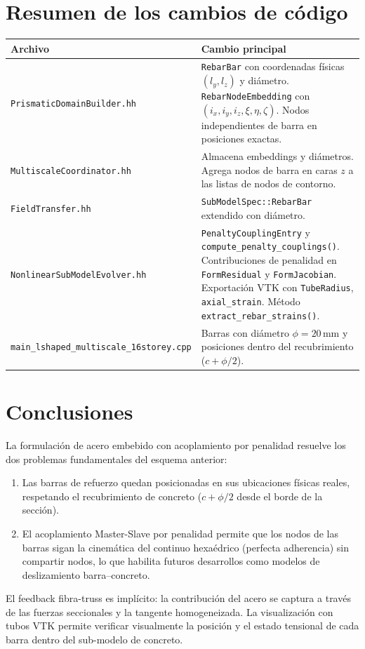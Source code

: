\section{Resumen de los cambios de código}
\label{sec:emb-code-summary}

\begin{center}
\small
\begin{tabular}{lp{8cm}}
\toprule
Archivo & Cambio principal \\
\midrule
\texttt{PrismaticDomainBuilder.hh} &
  \texttt{RebarBar} con coordenadas físicas $(l_y, l_z)$ y diámetro.
  \texttt{RebarNodeEmbedding} con $(i_x, i_y, i_z, \xi, \eta, \zeta)$.
  Nodos independientes de barra en posiciones exactas. \\[2pt]
\texttt{MultiscaleCoordinator.hh} &
  Almacena embeddings y diámetros.  Agrega nodos de barra en caras
  $z$ a las listas de nodos de contorno. \\[2pt]
\texttt{FieldTransfer.hh} &
  \texttt{SubModelSpec::RebarBar} extendido con diámetro. \\[2pt]
\texttt{NonlinearSubModelEvolver.hh} &
  \texttt{PenaltyCouplingEntry} y
  \texttt{compute\_penalty\_couplings()}.
  Contribuciones de penalidad en \texttt{FormResidual} y
  \texttt{FormJacobian}.  Exportación VTK con \texttt{TubeRadius},
  \texttt{axial\_strain}.  Método
  \texttt{extract\_rebar\_strains()}. \\[2pt]
\texttt{main\_lshaped\_multiscale\_16storey.cpp} &
  Barras con diámetro $\phi = 20$\,mm y posiciones dentro del
  recubrimiento ($c + \phi/2$). \\
\bottomrule
\end{tabular}
\end{center}


\section{Conclusiones}
\label{sec:emb-conclusions}

La formulación de acero embebido con acoplamiento por penalidad
resuelve los dos problemas fundamentales del esquema anterior:

\begin{enumerate}
  \item Las barras de refuerzo quedan posicionadas en sus ubicaciones
        físicas reales, respetando el recubrimiento de concreto
        ($c + \phi/2$ desde el borde de la sección).

  \item El acoplamiento Master-Slave por penalidad permite que los
        nodos de las barras sigan la cinemática del continuo
        hexaédrico (perfecta adherencia) sin compartir nodos, lo
        que habilita futuros desarrollos como modelos de
        deslizamiento barra--concreto.
\end{enumerate}

El feedback fibra-truss es implícito: la contribución del acero se
captura a través de las fuerzas seccionales y la tangente
homogeneizada.  La visualización con tubos VTK permite verificar
visualmente la posición y el estado tensional de cada barra dentro
del sub-modelo de concreto.
